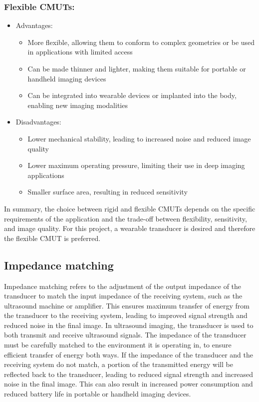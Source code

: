 \subsubsection{Flexible CMUTs:}
\begin{itemize}
	\item Advantages:
	\begin{itemize}
		\item More flexible, allowing them to conform to complex geometries or be used in applications with limited access
		\item Can be made thinner and lighter, making them suitable for portable or handheld imaging devices
		\item Can be integrated into wearable devices or implanted into the body, enabling new imaging modalities
	\end{itemize}
	\item Disadvantages:
	\begin{itemize}
		\item Lower mechanical stability, leading to increased noise and reduced image quality
		\item Lower maximum operating pressure, limiting their use in deep imaging applications
		\item Smaller surface area, resulting in reduced sensitivity
	\end{itemize}
\end{itemize}
In summary, the choice between rigid and flexible CMUTs depends on the specific requirements of the application and the trade-off between flexibility, sensitivity, and image quality. For this project, a wearable transducer is desired and therefore the flexible CMUT is preferred.

\subsection{Impedance matching}
Impedance matching refers to the adjustment of the output impedance of the transducer to match the input impedance of the receiving system, such as the ultrasound machine or amplifier. This ensures maximum transfer of energy from the transducer to the receiving system, leading to improved signal strength and reduced noise in the final image. In ultrasound imaging, the transducer is used to both transmit and receive ultrasound signals. The impedance of the transducer must be carefully matched to the environment it is operating in, to ensure efficient transfer of energy both ways. If the impedance of the transducer and the receiving system do not match, a portion of the transmitted energy will be reflected back to the transducer, leading to reduced signal strength and increased noise in the final image. This can also result in increased power consumption and reduced battery life in portable or handheld imaging devices.

